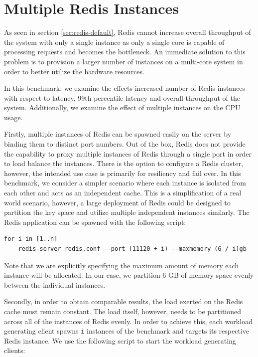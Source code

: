 \section{Multiple Redis Instances}
\label{sec:multiple-redis-instances}

As seen in section \ref{sec:redis-default}, Redis cannot increase overall throughput of the system with only a single instance as only a single core is capable of processing requests and becomes the bottleneck. An immediate solution to this problem is to provision a larger number of instances on a multi-core system in order to better utilize the hardware resources.

In this benchmark, we examine the effects increased number of Redis instances with respect to latency, 99th percentile latency and overall throughput of the system. Additionally, we examine the effect of multiple instances on the CPU usage.

Firstly, multiple instances of Redis can be spawned easily on the server by binding them to distinct port numbers. Out of the box, Redis does not provide the capability to proxy multiple instances of Redis through a single port in order to load balance the instances. There is the option to configure a Redis cluster, however, the intended use case is primarily for resiliency and fail over. In this benchmark, we consider a simpler scenario where each instance is isolated from each other and acts as an independent cache. This is a simplification of a real world scenario, however, a large deployment of Redis could be designed to partition the key space and utilize multiple independent instances similarly. The Redis application can be spawned with the following script:

\begin{lstlisting}
for i in [1..n]
    redis-server redis.conf --port (11120 + i) --maxmemory (6 / i)gb
\end{lstlisting}

Note that we are explicitly specifying the maximum amount of memory each instance will be allocated. In our case, we partition 6 GB of memory space evenly between the individual instances.

Secondly, in order to obtain comparable results, the load exerted on the Redis cache must remain constant. The load itself, however, needs to be partitioned across all of the instances of Redis evenly. In order to achieve this, each workload generating client spawns \texttt{i} instances of the benchmark and targets its respective Redis instance. We use the following script to start the workload generating clients:

